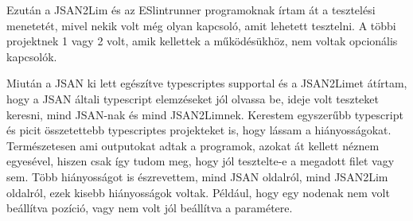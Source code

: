 \noindent

Ezután a JSAN2Lim és az ESlintrunner programoknak írtam át a tesztelési menetetét, mivel nekik volt még olyan kapcsoló, amit lehetett tesztelni. A többi projektnek 1 vagy 2 volt, amik kellettek a működésükhöz, nem voltak opcionális kapcsolók.

\noindent

Miután a JSAN ki lett egészítve typescriptes supportal és a JSAN2Limet átírtam, hogy a JSAN általi typescript elemzéseket jól olvassa be, ideje volt teszteket keresni, mind JSAN-nak és mind JSAN2Limnek.
Kerestem egyszerűbb typescript és picit összetettebb typescriptes projekteket is, hogy lássam a hiányosságokat.
Természetesen ami outputokat adtak a programok, azokat át kellett néznem egyesével, hiszen csak így tudom meg, hogy jól tesztelte-e a megadott filet vagy sem.
Több hiányosságot is észrevettem, mind JSAN oldalról, mind JSAN2Lim oldalról, ezek kisebb hiányosságok voltak.
Például, hogy egy nodenak nem volt beállítva pozíció, vagy nem volt jól beállítva a paramétere.
